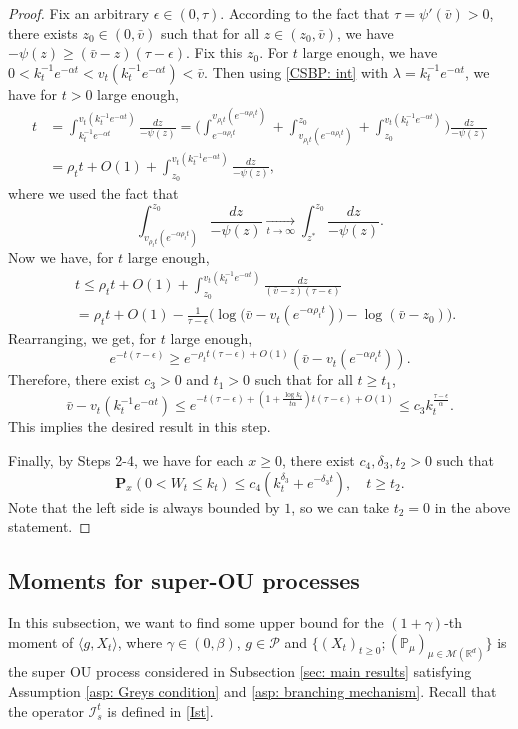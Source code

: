 \documentclass[12pt,a4paper]{amsart}
\theoremstyle{plain}
\theoremstyle{definition}
\numberwithin{equation}{section}
\begin{document}
\begin{proof}
    Fix an arbitrary $\epsilon \in (0,\tau)$.
    According to the fact that $\tau=\psi'(\bar v)>0$, there exists $z_0 \in (0,\bar v)$ such that for all $z\in (z_0, \bar v)$, we have $-\psi(z)\geq (\bar v - z)(\tau- \epsilon)$.     Fix this $z_0$.
    For $t$ large enough, we have $0<k_t^{-1}e^{-\alpha t} < v_t(k_t^{-1}e^{-\alpha t})< \bar v$.
        Then using \eqref{CSBP: int} with $\lambda=k_t^{-1} e^{-\alpha t}$, we have for $t>0$ large enough,
\begin{align}
    t& =\int^{v_t(k_t^{-1} e^{-\alpha t})}_{k_t^{-1} e^{-\alpha t}}\frac{dz}{-\psi(z)}
    = \Big(\int^{v_{\rho_t t}(e^{-\alpha \rho_t t})}_{e^{-\alpha \rho_t t}}  + \int^{z_0}_{v_{\rho_t t}(e^{-\alpha \rho_t t})} +\int^{v_t(k_t^{-1}e^{-\alpha  t})}_{z_0}\Big)\frac{dz}{-\psi(z)}
     \\&= \rho_t t + O(1) +\int^{v_t(k_t^{-1}e^{-\alpha t})}_{z_0} \frac{dz}{-\psi(z)},
\end{align}
    where we used the fact that
\[
    \int_{v_{\rho_t t}(e^{-\alpha \rho_tt})}^{z_0} \frac{dz}{-\psi(z)} \xrightarrow[t\to \infty] {}\int_{z^*}^{z_0} \frac{dz}{-\psi(z)}.
\]
    Now we have, for $t$ large enough,
\begin{align}
    &t\leq  \rho_t t + O(1)+ \int_{z_0}^{v_t(k_t^{-1}e^{-\alpha t})} \frac{dz}{(\bar v-z)(\tau - \epsilon)}
    \\&=  \rho_t t +O(1)- \frac{1}{\tau-\epsilon}\Big( \log \big(\bar v-v_t(e^{-\alpha \rho_t t})\big) - \log(\bar v-z_0)\Big).
\end{align}
    Rearranging, we get, for $t$ large enough,
\[
    e^{-t(\tau - \epsilon)} \geq e^{-\rho_t t(\tau - \epsilon)+O(1)}(\bar v - v_t(e^{-\alpha \rho_t t})).
\]
    Therefore, there exist
    $c_3>0$ and $t_1>0$ such that for all $t\geq t_1$,
\[
    \bar v - v_t(k_t^{-1} e^{-\alpha t}) \leq e^{-t(\tau -\epsilon)+ (1+\frac{\log k_t}{t\alpha})t(\tau - \epsilon)+O(1)}
   \leq c_3k_t^{\frac{\tau - \epsilon}{\alpha}}.
\]
    This implies the desired result in this step.

    Finally, by Steps 2-4, we have for each $x\geq 0$, there exist
     $c_4, \delta_3, t_2 > 0$ such that
\[
    \mathbf P_{x}(0< W_t\leq k_t) \leq
    c_4(k_t^{\delta_3}+e^{-\delta_3 t}),\quad t\geq t_2.
\]
Note that the left side is always bounded by $1$, so we can take $t_2 =0$ in the above statement.
\end{proof}

\subsection{Moments for super-OU processes}
\label{sec: Moments for super-OU processes}
    In this subsection,  we want to find some upper bound for the $(1+\gamma)$-th moment of $\langle g ,X_t \rangle$, 
    where $\gamma \in (0,\beta)$, $g\in \mathcal P$ and $\{(X_t)_{t\geq 0}; (\mathbb P_\mu)_{\mu \in \mathcal M(\mathbb R^d)}\}$ is the super OU process considered in Subsection \ref{sec: main results} satisfying Assumption \ref{asp: Greys condition} and \ref{asp: branching mechanism}.
    Recall that the operator $\mathcal{I}^t_s$ is defined in \eqref{Ist}.
\end{document}
